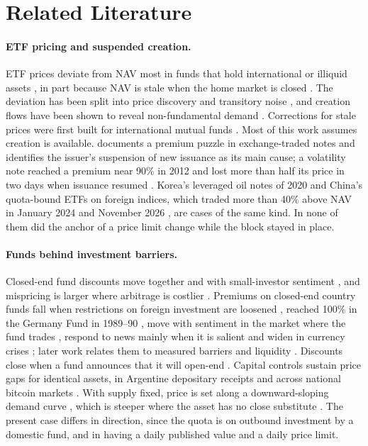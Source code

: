 \documentclass[11pt,a4paper]{article}
\theoremstyle{definition}
\begin{document}
\section{Related Literature}\label{sec:literature}
\paragraph{ETF pricing and suspended creation.} ETF prices deviate from NAV most in funds that hold international or illiquid assets \citep{petajisto2017inefficiencies,engle2006premiums}, in part because NAV is stale when the home market is closed \citep{levy2013overreaction}. The deviation has been split into price discovery and transitory noise \citep{madhavan2016price}, and creation flows have been shown to reveal non-fundamental demand \citep{brown2021etf}. Corrections for stale prices were first built for international mutual funds \citep{goetzmann2001day,zitzewitz2003who}. Most of this work assumes creation is available. \citet{johnson2016essays} documents a premium puzzle in exchange-traded notes and identifies the issuer's suspension of new issuance as its main cause; a volatility note reached a premium near 90\% in 2012 and lost more than half its price in two days when issuance resumed \citep{finra2012etn}. Korea's leveraged oil notes of 2020 \citep{baek2021investment} and China's quota-bound ETFs on foreign indices, which traded more than 40\% above NAV in January 2024 and November 2026 \citep{reuters2024china,caixin2026nov}, are cases of the same kind. In none of them did the anchor of a price limit change while the block stayed in place.

\paragraph{Funds behind investment barriers.} Closed-end fund discounts move together and with small-investor sentiment \citep{lee1991investor}, and mispricing is larger where arbitrage is costlier \citep{pontiff1996costly}. Premiums on closed-end country funds fall when restrictions on foreign investment are loosened \citep{bonserneal1990international}, reached 100\% in the Germany Fund in 1989--90 \citep{hardouvelis1994moves}, move with sentiment in the market where the fund trades \citep{bodurtha1995closed}, respond to news mainly when it is salient \citep{klibanoff1998investor} and widen in currency crises \citep{chandar2000why}; later work relates them to measured barriers and liquidity \citep{chan2008market,kim2010investment,davies2017time}. Discounts close when a fund announces that it will open-end \citep{brauer1984open}. Capital controls sustain price gaps for identical assets, in Argentine depositary receipts \citep{auguste2006cross} and across national bitcoin markets \citep{makarov2020trading}. With supply fixed, price is set along a downward-sloping demand curve \citep{shleifer1986demand}, which is steeper where the asset has no close substitute \citep{wurgler2002does}. The present case differs in direction, since the quota is on outbound investment by a domestic fund, and in having a daily published value and a daily price limit.
\end{document}
